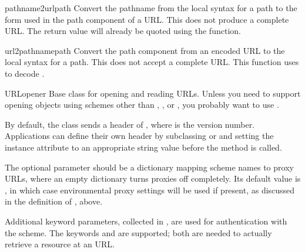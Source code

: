 \begin{funcdesc}{pathname2url}{path}
Convert the pathname  from the local syntax for a path to
the form used in the path component of a URL.  This does not produce a
complete URL.  The return value will already be quoted using the
 function.
\end{funcdesc}

\begin{funcdesc}{url2pathname}{path}
Convert the path component  from an encoded URL to the local
syntax for a path.  This does not accept a complete URL.  This
function uses  to decode .
\end{funcdesc}

\begin{classdesc}{URLopener}{}
Base class for opening and reading URLs.  Unless you need to support
opening objects using schemes other than , ,
 or , you probably want to use
.

By default, the  class sends a
 header of , where
 is the  version number.  Applications can
define their own  header by subclassing
 or  and setting the instance
attribute  to an appropriate string value before the
 method is called.

The optional  parameter should be a dictionary mapping
scheme names to proxy URLs, where an empty dictionary turns proxies
off completely.  Its default value is , in which case
environmental proxy settings will be used if present, as discussed in
the definition of , above.

Additional keyword parameters, collected in , are used for
authentication with the  scheme.  The keywords
 and  are supported; both are needed to
actually retrieve a resource at an  URL.
\end{classdesc}


